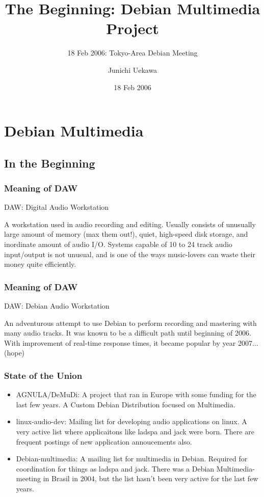 \documentclass[dvipdfmx]{beamer}
\title[Tokyo-Area Debian Meeting]{The Beginning: Debian Multimedia Project}
\subtitle{18 Feb 2006: Tokyo-Area Debian Meeting}
\author{Junichi Uekawa}
\date{18 Feb 2006}
\begin{document}
\frame{\titlepage{}}
 
 \section{Debian Multimedia}
 \subsection{In the Beginning}
 \begin{frame}
  \frametitle{Meaning of DAW}
   DAW: Digital Audio Workstation

  A workstation used in audio recording and editing. Usually consists of
  unusually large amount of memory (max them out!), quiet, high-speed
  disk storage, and inordinate amount of audio I/O. Systems capable of
  10 to 24 track audio input/output is not unusual, and is one of the
  ways music-lovers can waste their money quite efficiently.

 \end{frame}
 
 \begin{frame}
  \frametitle{Meaning of DAW}
  DAW: Debian Audio Workstation

  An adventurous attempt to use Debian to perform recording and mastering
  with many audio tracks. It was known to be a difficult path until
  beginning of 2006. With improvement of real-time response times, it
  became popular by year 2007... (hope)

 \end{frame}


\begin{frame}
\frametitle{State of the Union}
 \begin{itemize}
  \item AGNULA/DeMuDi:
	A project that ran in Europe with some funding for the last few
	years.
	A Custom Debian Distribution focused on Multimedia.
  \item linux-audio-dev: 
	Mailing list for developing audio applications on linux. 
	A very active list where applicaitons like ladspa and jack were born.
	There are frequent postings of new application annoucements also.
  \item Debian-multimedia: A mailing list for multimedia in Debian.
	Required for coordination for things as ladspa and jack.  There
	was a Debian Multimedia-meeting in Brasil in 2004, but the list
	hasn't been very active for the last few years.
 \end{itemize}
\end{frame}
\end{document}
